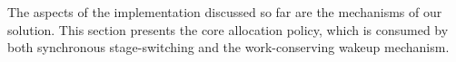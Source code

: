 \documentclass[12pt,a4paper]{book}
\begin{document}
%


%
The aspects of the implementation discussed so far are the mechanisms of our solution.
This section presents the core allocation policy, which is consumed by both synchronous stage-switching and the work-conserving wakeup mechanism.

\end{document}
